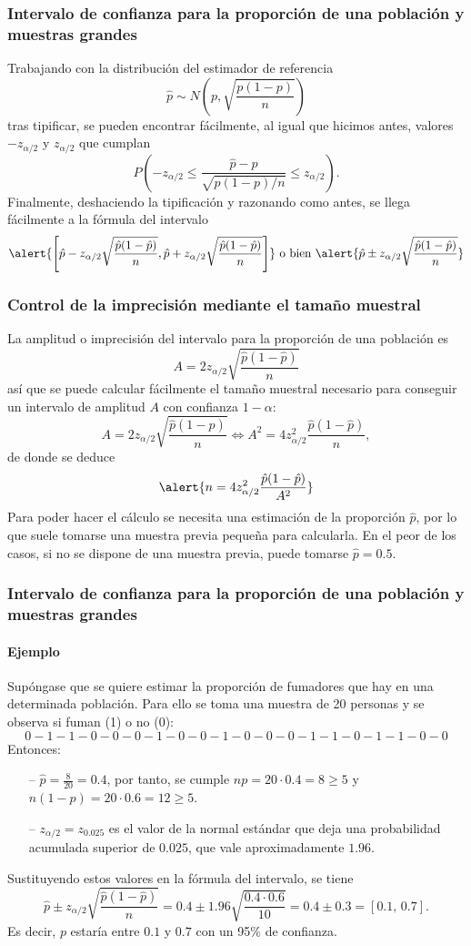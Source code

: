 \begin{frame}
\frametitle{Intervalo de confianza para la proporción de una población y muestras grandes}
Trabajando con la distribución del estimador de referencia
\[
\hat p\sim N\left(p,\sqrt{\frac{p(1-p)}{n}}\right)
\]
tras tipificar, se pueden encontrar fácilmente, al igual que hicimos antes, valores $-z_{\alpha/2}$ y $z_{\alpha/2}$
que cumplan
\[
P\left(-z_{\alpha/2}\leq \frac{\hat p-p}{\sqrt{p(1-p)/n}}\leq z_{\alpha/2} \right).
\]
Finalmente, deshaciendo la tipificación y razonando como antes, se llega fácilmente a la fórmula del intervalo
\[
\alert{\left[\hat{p}-z_{\alpha/2}\sqrt{\frac{\hat{p}(1-\hat{p})}{n}},\hat{p}+z_{\alpha/2}\sqrt{\frac{\hat{p}(1-\hat{p})}{n}}\right]}
\mbox{ o bien }
\alert{\hat{p}\pm z_{\alpha/2}\sqrt{\frac{\hat{p}(1-\hat{p})}{n}}}
\]
\end{frame}


\begin{frame}
\frametitle{Control de la imprecisión mediante el tamaño muestral}
La amplitud o imprecisión del intervalo para la proporción de una población es
\[
A= 2 z_{\alpha/2}\sqrt{\frac{\hat{p}(1-\hat{p})}{n}}
\]
así que se puede calcular fácilmente el tamaño muestral necesario para conseguir un intervalo de amplitud $A$ con confianza $1-\alpha$:
\[
A= 2 z_{\alpha/2}\sqrt{\frac{\hat{p}(1-\hat{p})}{n}} \Leftrightarrow A^2= 4 z_{\alpha/2}^2\frac{\hat{p}(1-\hat{p})}{n},
\]
de donde se deduce
\[
\alert{n= 4 z_{\alpha/2}^2\frac{\hat{p}(1-\hat{p})}{A^2}}
\]
Para poder hacer el cálculo se necesita una estimación de la proporción $\hat{p}$, por lo que suele tomarse una muestra previa pequeña para calcularla.
En el peor de los casos, si no se dispone de una muestra previa, puede tomarse $\hat{p}=0.5$.
\end{frame}


\begin{frame}
\frametitle{Intervalo de confianza para la proporción de una población y muestras grandes}
\framesubtitle{Ejemplo}
Supóngase que se quiere estimar la proporción de fumadores que hay en una determinada población.
Para ello se toma una muestra de 20 personas y se observa si fuman (1) o no (0):
\[
0 - 1 - 1 - 0 - 0 - 0 - 1 - 0 - 0 - 1 - 0 - 0 - 0 - 1 - 1- 0 - 1 - 1 - 0 - 0
\]
Entonces:
\begin{itemize}
\item[--] $\hat p=\frac{8}{20}=0.4$, por tanto, se cumple $np=20\cdot 0.4 = 8\geq 5$ y $n(1-p)=20\cdot 0.6= 12\geq 5$.
\item[--] $z_{\alpha/2}=z_{0.025}$ es el valor de la normal estándar que deja una probabilidad acumulada superior de $0.025$, que vale aproximadamente $1.96$.
\end{itemize}
Sustituyendo estos valores en la fórmula del intervalo, se tiene
\[
\hat{p}\pm z_{\alpha/2}\sqrt{\frac{\hat{p}(1-\hat{p})}{n}} = 0.4\pm 1.96\sqrt{\frac{0.4\cdot 0.6}{10}} = 0.4\pm  0.3 = \left[0.1,\,0.7\right].
\]
Es decir, $p$ estaría entre $0.1$ y $0.7$ con un 95\% de confianza.
\end{frame}


